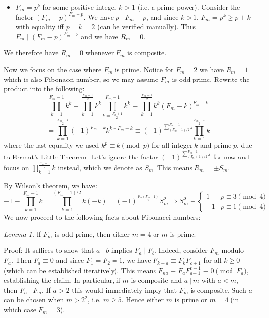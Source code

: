 \documentclass[11pt,a4paper]{article}
\newcommand{\<}{\langle}
\renewcommand{\>}{\rangle}
\begin{document}
\begin{enumerate}
\begin{itemize}
		\item $F_m=p^k$ for some positive integer $k>1$ (i.e. a prime power). 
		Consider the factor $(F_m-p)^{F_m-p}$. We have $p\mid F_m-p$, and since $k>1$, $F_m=p^k\ge p+k$ with equality iff $p=k=2$ (can be verified manually). 
		Thus $F_m\mid (F_m-p)^{F_m-p}$ and we have $R_m=0$. 
	\end{itemize}
    We therefore have $R_m=0$ whenever $F_m$ is composite. 
    
    Now we focus on the case where $F_m$ is prime. Notice for $F_m=2$ we have $R_m=1$ which is also Fibonacci number, so we may assume $F_m$ is odd prime. 
    Rewrite the product into the following: 
    \[
    \prod_{k=1}^{F_m-1} k^k
    \equiv \prod_{k=1}^{\frac{F_m-1}{2}} k^k
    \prod_{k=\frac{F_m+1}{2}}^{F_m-1} k^k
    \equiv \prod_{k=1}^{\frac{F_m-1}{2}} k^k(F_m-k)^{F_m-k}
    \]\[
    =\prod_{k=1}^{\frac{F_m-1}{2}} (-1)^{F_m-k}k^{k+F_m-k}
    \equiv(-1)^{\sum_{(F_m+1)/2}^{F_m-1}j}\prod_{k=1}^{\frac{F_m-1}{2}} k
    \]
    where the last equality we used $k^p\equiv k\pmod{p}$ for all integer $k$ and prime $p$, 
    due to Fermat's Little Theorem. 
    Let's ignore the factor $(-1)^{\sum_{(F_m+1)/2}^{F_m-1}j}$ for now and 
    focus on $\prod_{k=1}^{\frac{F_m-1}{2}} k$ instead, which we denote as $S_m$. 
    This means $R_m=\pm S_m$. 
    
    By Wilson's theorem, we have: 
    \[
    -1\equiv \prod_{k=1}^{F_m-1}k
    =\prod_{k=1}^{(F_m-1)/2}k (-k)
    =(-1)^{\frac{F_m(F_m-1)}{2}}S_m^2
    \Rightarrow 
    S_m^2\equiv 
    \begin{cases}
      1 & p\equiv 3\pmod{4}\\
      -1 & p\equiv 1\pmod{4}
    \end{cases}
    \]
    We now proceed to the following facts about Fibonacci numbers: 
    
    \emph{Lemma 1.} If $F_m$ is odd prime, then either $m=4$ or $m$ is prime. 
    
    Proof: It suffices to show that $a\mid b$ implies $F_a\mid F_b$. 
    Indeed, consider $F_m$ modulo $F_a$. 
    Then $F_a\equiv 0$ and since $F_1=F_2=1$, 
    we have $F_{k+a}\equiv F_kF_{a+1}$ for all $k\ge 0$ (which can be established iteratively). 
    This means $F_{na}\equiv F_aF_{a+1}^{n-1}\equiv 0\pmod{F_a}$, establishing the claim. 
    In particular, if $m$ is composite and $a\mid m$ with $a<m$, then $F_a\mid F_m$. 
    If $a>2$ this would immediately imply that $F_m$ is composite. 
    Such $a$ can be chosen when $m>2^2$, i.e. $m\ge 5$. 
    Hence either $m$ is prime or $m=4$ (in which case $F_m=3$). 
    

\end{enumerate}
\end{document}
